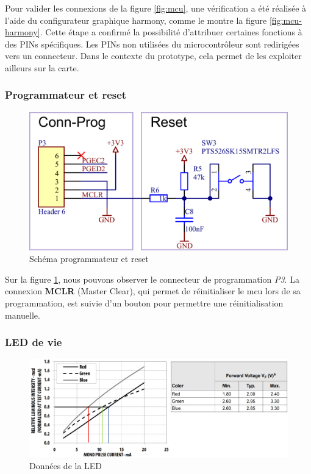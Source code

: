 Pour valider les connexions de la figure \ref{fig:mcu}, une vérification a été réalisée à l'aide du configurateur graphique \gls{harmony}, comme le montre la figure \ref{fig:mcu-harmony}. Cette étape a confirmé la possibilité d'attribuer certaines fonctions à des PINs spécifiques. Les PINs non utilisées du microcontrôleur sont redirigées vers un connecteur. Dans le contexte du prototype, cela permet de les exploiter ailleurs sur la carte.


\subsubsection{Programmateur et reset} 

\begin{figure}[h]
	\centering
	\includegraphics[width=.65\linewidth]{../figures/etude/sch/Prog-Reset}
	\caption{Schéma programmateur et reset}
	\label{fig:prog-reset}
\end{figure}

Sur la figure \ref{fig:prog-reset}, nous pouvons observer le connecteur de programmation \textit{P3}. La connexion \textbf{MCLR} (Master Clear), qui permet de réinitialiser le \gls{mcu} lors de sa programmation, est suivie d'un bouton pour permettre une réinitialisation manuelle.

\clearpage

\subsubsection{LED de vie} 

\begin{figure}[h]
	\centering
	\includegraphics[width=.9\linewidth]{../figures/etude/DIM-LED}
	\caption{Données de la LED}
	\label{fig:dim-led}
\end{figure}

